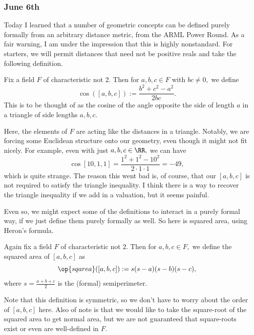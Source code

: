 \subsubsection{June 6th}
Today I learned that a number of geometric concepts can be defined purely formally from an arbitrary distance metric, from the ARML Power Round. As a fair warning, I am under the impression that this is highly nonstandard. For starters, we will permit distances that need not be positive reals and take the following definition.
\begin{definition}
    Fix a field $F$ of characteristic not $2.$ Then for $a,b,c\in F$ with $bc\ne0,$ we define
    \[\cos([a,b,c]):=\frac{b^2+c^2-a^2}{2bc}.\]
    This is to be thought of as the cosine of the angle opposite the side of length $a$ in a triangle of side lengths $a,b,c.$
\end{definition}
Here, the elements of $F$ are acting like the distances in a triangle. Notably, we are forcing some Euclidean structure onto our geometry, even though it might not fit nicely. For example, even with just $a,b,c\in\RR,$ we can have
\[\cos[10,1,1]=\frac{1^2+1^2-10^2}{2\cdot1\cdot1}=-49,\]
which is quite strange. The reason this went bad is, of course, that our $[a,b,c]$ is not required to satisfy the triangle inequality. I think there is a way to recover the triangle inequality if we add in a valuation, but it seems painful.

Even so, we might expect some of the definitions to interact in a purely formal way, if we just define them purely formally as well. So here is squared area, using Heron's formula.
\begin{definition}
    Again fix a field $F$ of characteristic not $2.$ Then for $a,b,c\in F,$ we define the squared area of $[a,b,c]$ as
    \[\op{sqarea}([a,b,c]):=s(s-a)(s-b)(s-c),\]
    where $s=\frac{a+b+c}2$ is the (formal) semiperimeter.
\end{definition}
Note that this definition is symmetric, so we don't have to worry about the order of $[a,b,c]$ here. Also of note is that we would like to take the square-root of the squared area to get normal area, but we are not guaranteed that square-roots exist or even are well-defined in $F.$

